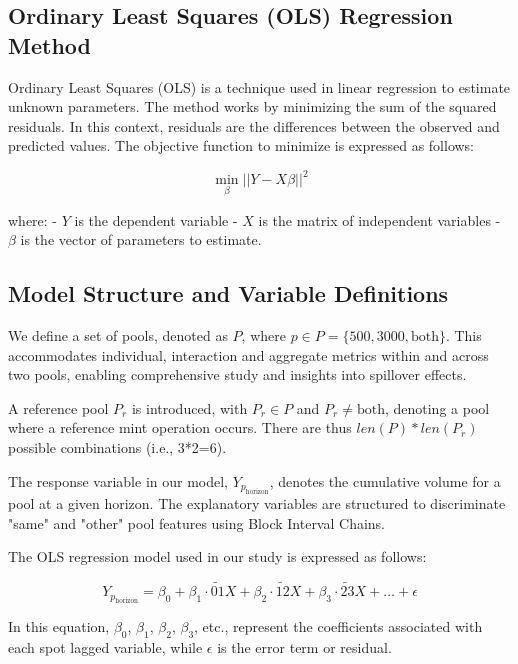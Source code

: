 \documentclass{article}
\begin{document}
\subsection{Ordinary Least Squares (OLS) Regression Method}

Ordinary Least Squares (OLS) is a technique used in linear regression to estimate unknown parameters. The method works by minimizing the sum of the squared residuals. In this context, residuals are the differences between the observed and predicted values. The objective function to minimize is expressed as follows:

\begin{equation}
\min_{\beta} ||Y - X\beta||^2
\end{equation}

where:
- $Y$ is the dependent variable
- $X$ is the matrix of independent variables
- $\beta$ is the vector of parameters to estimate.

\subsection{Model Structure and Variable Definitions}

We define a set of pools, denoted as \(P\), where \(p \in P=\{500,3000,\text{both}\}\). This accommodates individual, interaction and aggregate metrics within and across two pools, enabling comprehensive study and insights into spillover effects. 

A reference pool \(P_r\) is introduced, with \(P_r \in P\) and \(P_r \neq \text{both}\), denoting a pool where a reference mint operation occurs. There are thus \(len(P) * len(P_r)\) possible combinations (i.e., 3*2=6).

The response variable in our model, \(Y_{p_{\text{horizon}}}\), denotes the cumulative volume for a pool at a given horizon. The explanatory variables are structured to discriminate "same" and "other" pool features using Block Interval Chains. 

The OLS regression model used in our study is expressed as follows:

\begin{equation}
Y_{p_{\text{horizon}}} = \beta_0 + \beta_1 \cdot \widetilde{01}X + \beta_2 \cdot \widetilde{12}X + \beta_3 \cdot \widetilde{23}X + \ldots + \epsilon
\end{equation}

In this equation, \(\beta_0\), \(\beta_1\), \(\beta_2\), \(\beta_3\), etc., represent the coefficients associated with each spot lagged variable, while \(\epsilon\) is the error term or residual.
\end{document}
